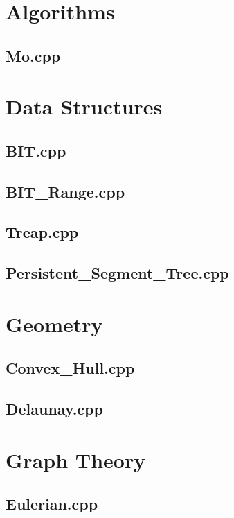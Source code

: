 \section{Algorithms}
\subsection{Mo.cpp}

\section{Data Structures}
\subsection{BIT.cpp}

\subsection{BIT\_Range.cpp}

\subsection{Treap.cpp}

\subsection{Persistent\_Segment\_Tree.cpp}

\section{Geometry}
\subsection{Convex\_Hull.cpp}

\subsection{Delaunay.cpp}

\section{Graph Theory}
\subsection{Eulerian.cpp}

